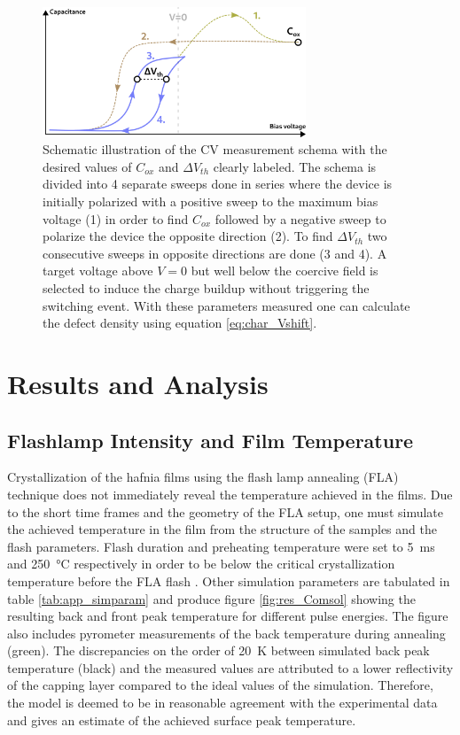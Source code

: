 \documentclass[11pt,twoside]{eitExjobb}
\begin{document}
\begin{figure}[htbp]
    \centering
    \includegraphics[width=0.70\textwidth]{fig/img/UniCV.png}
    \caption{Schematic illustration of the CV measurement schema with the
    desired values of $C_{ox}$ and $\Delta V_{th}$ clearly labeled. The schema
    is divided into 4 separate sweeps done in series where the device is initially
    polarized with a positive sweep to the maximum bias voltage (1) in order to
    find $C_{ox}$ followed by a negative sweep to polarize the device the opposite
    direction (2). To find $\Delta V_{th}$ two consecutive sweeps in opposite
    directions are done (3 and 4). A target voltage above $V=0$ but well below the coercive
    field is selected to induce the charge buildup without triggering the switching
    event. With these parameters measured one can calculate the defect density
    using equation \ref{eq:char_Vshift}.}
    \label{fig:char_CV}
\end{figure}

\chapter{Results and Analysis}\label{ch:res}

\section{Flashlamp Intensity and Film Temperature}
Crystallization of the hafnia films using the flash lamp annealing (FLA)
technique does not immediately reveal the temperature achieved in the films. Due
to the short time frames and the geometry of the FLA setup, one must simulate
the achieved temperature in the film from the structure of the samples and the
flash parameters. Flash duration and preheating temperature were set to
\SI{5}{\milli\second} and \SI{250}{\celsius} respectively in order to be below
the critical crystallization temperature before the FLA
flash \cite{migita2019phase}. Other simulation parameters are tabulated in
table \ref{tab:app_simparam} and produce figure \ref{fig:res_Comsol} showing the
resulting back and front peak temperature for different pulse energies. The figure also
includes pyrometer measurements of the back temperature during annealing
(green). The discrepancies on the order of \SI{20}{\kelvin} between simulated
back peak temperature (black) and the measured values are attributed to a 
lower reflectivity of the  capping layer compared to the ideal values of
the simulation. Therefore, the model is deemed to be in reasonable agreement
with the experimental data and gives an estimate of the achieved surface peak temperature.
\end{document}
